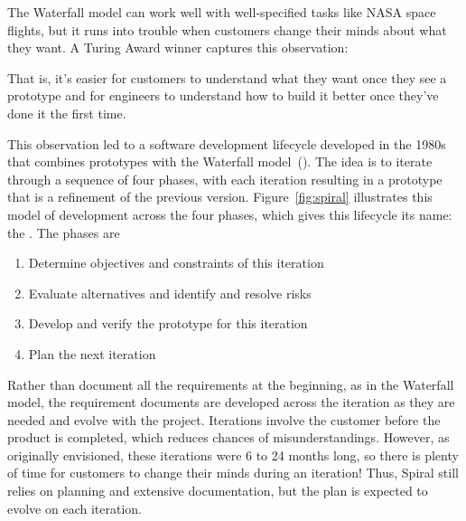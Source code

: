 The Waterfall model can work well with well-specified tasks like NASA space flights,
but it runs into trouble when customers change their minds about what
they want. A Turing Award winner captures this observation:


That is, it's easier for customers to understand what they want once they see a prototype and for engineers to understand how to build it better once they've done it the first time.

This observation led to a software development lifecycle developed in the 1980s that combines prototypes with the Waterfall model~(\cite{boehm86}). The idea is to iterate through a sequence of four phases, with each iteration resulting in a prototype that is a refinement of the previous version. Figure~\ref{fig:spiral} illustrates this model of development across the four phases, which gives this lifecycle its name: the
.
The phases are
\begin{enumerate}

\item Determine objectives and constraints of this iteration

\item Evaluate alternatives and identify and resolve risks

\item Develop and verify the prototype for this iteration

\item Plan the next iteration

\end{enumerate}


Rather than document all the requirements at the beginning, as in the Waterfall model, the requirement documents are developed across the iteration as they are needed and evolve with the project. Iterations involve the customer before the product is completed, which reduces chances of misunderstandings. However, as originally envisioned, these iterations were 6 to 24 months long, so there is plenty of time for customers to change their minds during an iteration! Thus, Spiral still relies on planning and extensive documentation, but the plan is expected to evolve on each iteration.

